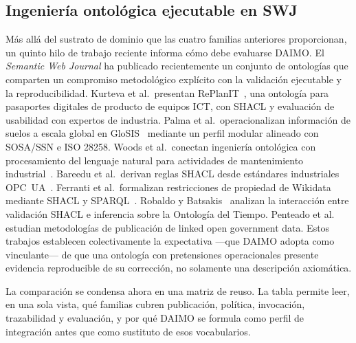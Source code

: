 \documentclass[Afour,sagev,times]{sagej}
\begin{document}
\subsection{Ingeniería ontológica ejecutable en SWJ}

Más allá del sustrato de dominio que las cuatro familias anteriores proporcionan, un quinto hilo de trabajo reciente informa cómo debe evaluarse DAIMO. El \emph{Semantic Web Journal} ha publicado recientemente un conjunto de ontologías que comparten un compromiso metodológico explícito con la validación ejecutable y la reproducibilidad. Kurteva et al.\ presentan RePlanIT~\cite{kurteva}, una ontología para pasaportes digitales de producto de equipos ICT, con SHACL y evaluación de usabilidad con expertos de industria. Palma et al.\ operacionalizan información de suelos a escala global en GloSIS~\cite{palma} mediante un perfil modular alineado con SOSA/SSN e ISO 28258. Woods et al.\ conectan ingeniería ontológica con procesamiento del lenguaje natural para actividades de mantenimiento industrial~\cite{woods}. Bareedu et al.\ derivan reglas SHACL desde estándares industriales OPC~UA~\cite{bareedu24}. Ferranti et al.\ formalizan restricciones de propiedad de Wikidata mediante SHACL y SPARQL~\cite{ferranti}. Robaldo y Batsakis~\cite{robaldo} analizan la interacción entre validación SHACL e inferencia sobre la Ontología del Tiempo. Penteado et al.~\cite{penteado23} estudian metodologías de publicación de linked open government data. Estos trabajos establecen colectivamente la expectativa ---que DAIMO adopta como vinculante--- de que una ontología con pretensiones operacionales presente evidencia reproducible de su corrección, no solamente una descripción axiomática.

La comparación se condensa ahora en una matriz de reuso. La tabla permite leer, en una sola vista, qué familias cubren publicación, política, invocación, trazabilidad y evaluación, y por qué DAIMO se formula como perfil de integración antes que como sustituto de esos vocabularios.
\end{document}
